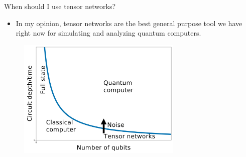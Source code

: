 \begin{frame}{When should I use tensor networks?}

\begin{itemize}[<+->]

  \item In my opinion, tensor networks are the best general purpose tool we have right now for simulating and analyzing quantum computers.

\end{itemize}

\begin{figure}[T]
  \includegraphics[width=0.7\textwidth]{
    slides/assets/plots/quantum-volume/quantum-volume.jpg
  }
\end{figure}

\end{frame}
